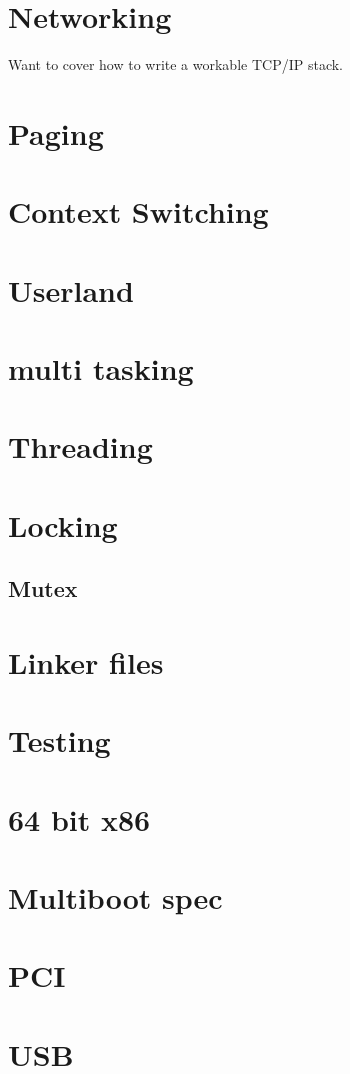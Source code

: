 \documentclass[oneside,english,final]{amsbook}
\begin{document}
\chapter{Networking}
Want to cover how to write a workable TCP/IP stack.
\chapter{Paging}
\chapter{Context Switching}
\chapter{Userland}
\chapter{multi tasking}
\chapter{Threading}
\chapter{Locking}
\section{Mutex}

\chapter{Linker files}
\chapter{Testing}
\chapter{64 bit x86}
\chapter{Multiboot spec}
\chapter{PCI}
\chapter{USB}
\end{document}
